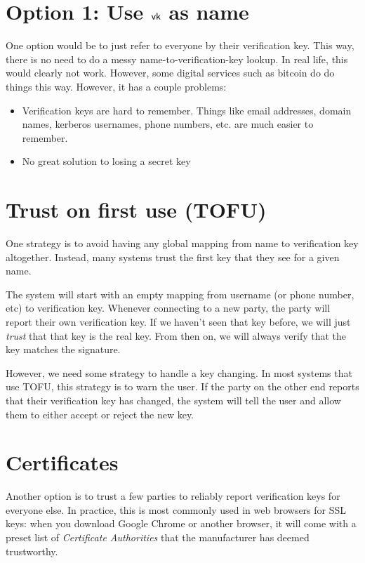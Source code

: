
\section{Option 1: Use $\mathsf{vk}$ as name}
One option would be to just refer to everyone by their verification key. This way, there is no need to do a messy name-to-verification-key lookup. In real life, this would clearly not work. However, some digital services such as bitcoin do do things this way. However, it has a couple problems:
\begin{itemize}
	\item Verification keys are hard to remember. Things like email addresses, domain names, kerberos usernames, phone numbers, etc. are much easier to remember.
	\item No great solution to losing a secret key
\end{itemize}


\section{Trust on first use (TOFU)}
One strategy is to avoid having any global mapping from name to verification key altogether. Instead, many systems trust the first key that they see for a given name.

The system will start with an empty mapping from username (or phone number, etc) to verification key. Whenever connecting to a new party, the party will report their own verification key. If we haven't seen that key before, we will just \emph{trust} that that key is the real key. From then on, we will always verify that the key matches the signature. 

However, we need some strategy to handle a key changing. In most systems that use TOFU, this strategy is to warn the user. If the party on the other end reports that their verification key has changed, the system will tell the user and allow them to either accept or reject the new key.


\section{Certificates}
Another option is to trust a few parties to reliably report verification keys for everyone else. In practice, this is most commonly used in web browsers for SSL keys: when you download Google Chrome or another browser, it will come with a preset list of \emph{Certificate Authorities} that the manufacturer has deemed trustworthy. 

